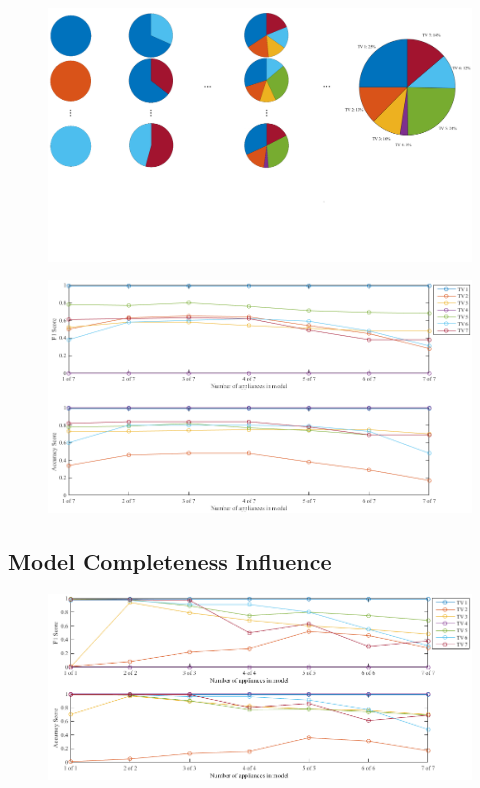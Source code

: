 \begin{figure}[H]
\centering
\includegraphics[width=1\textwidth]{billeder/CombiShow.png}
\caption{}
\end{figure}


\begin{figure}[H]
\centering
\includegraphics[width=1\textwidth]{billeder/ModelCompletness.png}
\caption{}
\end{figure}

\subsection{ Model Completeness Influence }

\begin{figure}[H]
\centering
\includegraphics[width=1\textwidth]{billeder/ModelSize.png}
\caption{}
\end{figure}